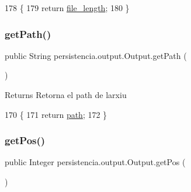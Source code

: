 \begin{DoxyCode}
178                             \{
179         \textcolor{keywordflow}{return} \hyperlink{classpersistencia_1_1output_1_1Output_a028761929614fdc2b88f9ebe0e2313ef}{file\_length};
180     \}
\end{DoxyCode}
\mbox{\label{classpersistencia_1_1output_1_1Output_ae33fc52334f791b6d4d7aebf2931df8d}} 
\subsubsection{\texorpdfstring{get\+Path()}{getPath()}}
{\footnotesize\ttfamily public String persistencia.\+output.\+Output.\+get\+Path (\begin{DoxyParamCaption}{ }\end{DoxyParamCaption})\hspace{0.3cm}{\ttfamily [inline]}}

\begin{DoxyReturn}{Returns}
Retorna el path de l\textquotesingle{}arxiu 
\end{DoxyReturn}

\begin{DoxyCode}
170                             \{
171         \textcolor{keywordflow}{return} \hyperlink{classpersistencia_1_1output_1_1Output_aebef717882f3bcc7080dec014c6714c9}{path};
172     \}
\end{DoxyCode}
\mbox{\label{classpersistencia_1_1output_1_1Output_a01f862217e01efb59bc2eff3fe54006f}} 
\subsubsection{\texorpdfstring{get\+Pos()}{getPos()}}
{\footnotesize\ttfamily public Integer persistencia.\+output.\+Output.\+get\+Pos (\begin{DoxyParamCaption}{ }\end{DoxyParamCaption})\hspace{0.3cm}{\ttfamily [inline]}}

